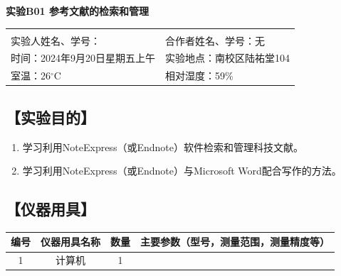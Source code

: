 \documentclass[12pt,a4paper]{article}
\begin{document}

\begin{center}
\LARGE\textbf{实验B01 参考文献的检索和管理}
\end{center}

\begin{doublespacing}
	\centering
	\begin{tabular}{p{6.5cm}p{6.5cm}}
	 & \\
	 实验人姓名、学号： & 合作者姓名、学号：无\\
	 {时间：2024年9月20日星期五上午} & {实验地点：南校区陆祐堂104}\\
	 {室温：26$^{\circ}$C} & 相对湿度：59\%
	
	\end{tabular}
\end{doublespacing}



\subsection*{【实验目的】}
	\begin{enumerate}[(1)]
		\item 学习利用NoteExpress（或Endnote）软件检索和管理科技文献。
		\item 学习利用NoteExpress（或Endnote）与Microsoft Word配合写作的方法。
	\end{enumerate}

\subsection*{【仪器用具】}
	\begin{table}[htbp]
	  \centering
	    \begin{tabular}{cccp{20em}}
	    \toprule
	    编号    & 仪器用具名称 & 数量    & 主要参数（型号，测量范围，测量精度等） \\
	    \midrule
	    1     & 计算机 & 1     &  \\
	    \bottomrule
	    \end{tabular}%
	  \label{tab:device}%
	\end{table}%
\end{document}
